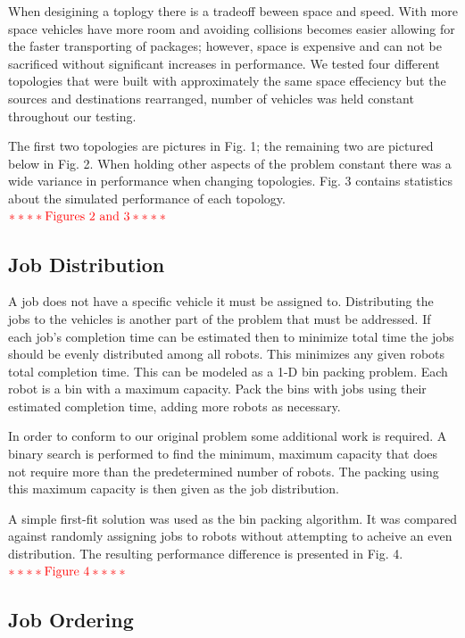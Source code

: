 \documentclass[11pt]{article}
\newcommand{\TODO}[1]{${\bf{\textcolor{red}{**** \text{#1} ****}}}$}
\begin{document}
When desigining a toplogy there is a tradeoff beween space and speed. With more space vehicles have more room and avoiding collisions becomes easier allowing for the faster transporting of packages; however, space is expensive and can not be sacrificed without significant increases in performance. We tested four different topologies that were built with approximately the same space effeciency but the sources and destinations rearranged, number of vehicles was held constant throughout our testing.

The first two topologies are pictures in Fig. 1; the remaining two are pictured below in Fig. 2. When holding other aspects of the problem constant there was a wide variance in performance when changing topologies. Fig. 3 contains statistics about the simulated performance of each topology. \\

\TODO{Figures 2 and 3}

\subsection{Job Distribution}

A job does not have a specific vehicle it must be assigned to. Distributing the jobs to the vehicles is another part of the problem that must be addressed. If each job's completion time can be estimated then to minimize total time the jobs should be evenly distributed among all robots. This minimizes any given robots total completion time. This can be modeled as a 1-D bin packing problem. Each robot is a bin with a maximum capacity. Pack the bins with jobs using their estimated completion time, adding more robots as necessary. 

In order to conform to our original problem some additional work is required. A binary search is performed to find the minimum, maximum capacity that does not require more than the predetermined number of robots. The packing using this maximum capacity is then given as the job distribution.

A simple first-fit solution was used as the bin packing algorithm. It was compared against randomly assigning jobs to robots without attempting to acheive an even distribution. The resulting performance difference is presented in Fig. 4. \\

\TODO{Figure 4}

\subsection{Job Ordering}
\end{document}
